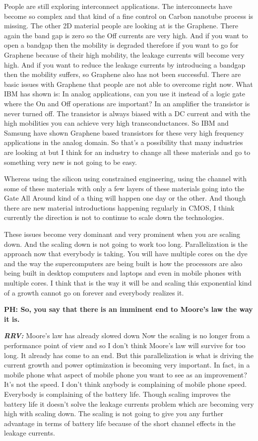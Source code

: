 \begin{multicols}{2}
People are still exploring interconnect applications. The interconnects have become so complex and that kind of a fine control on Carbon nanotube process is missing. The other 2D material people are looking at is the Graphene. There again the band gap is zero so the Off currents are very high. And if you want to open a bandgap then the mobility is degraded therefore if you want to go for Graphene because of their high mobility, the leakage currents will become very high. And if you want to reduce the leakage currents by introducing a bandgap then the mobility suffers, so Graphene also has not been successful. There are basic issues with Graphene that people are not able to overcome right now. What IBM has shown is: In analog applications, can you use it instead of a logic gate where the On and Off operations are important? In an amplifier the transistor is never turned off. The transistor is always biased with a DC current and with the high mobilities you can achieve very high transconductances. So IBM and Samsung have shown Graphene based transistors for these very high frequency applications in the analog domain. So that’s a possibility that many industries are looking at but I think for an industry to change all these materials and go to something very new is not going to be easy. 

Whereas using the silicon using constrained engineering, using the channel with some of these materials with only a few layers of these materials going into the Gate All Around kind of a thing will happen one day or the other. And though there are new material introductions happening regularly in CMOS, I think currently the direction is not to continue to scale down the technologies.

These issues become very dominant and very prominent when you are scaling down. And the scaling down is not going to work too long. Parallelization is the approach now that everybody is taking. You will have multiple cores on the dye and the way the supercomputers are being built is how the processors are also being built in desktop computers and laptops and even in mobile phones with multiple cores. I think that is the way it will be and scaling this exponential kind of a growth cannot go on forever and everybody realizes it.

\textbf{PH:  So, you say that there is an imminent end to Moore’s law the way it is.}

\textbf{\textit{RRV:}} Moore’s law has already slowed down Now the scaling is no longer from a performance point of view and so I don’t think Moore’s law will survive for too long. It already has come to an end. But this parallelization is what is driving the current growth and power optimization is becoming very important. In fact, in a mobile phone what aspect of mobile phone you want to see as an improvement? It’s not the speed. I don’t think anybody is complaining of mobile phone speed. Everybody is complaining of the battery life. Though scaling improves the battery life it doesn’t solve the leakage currents problem which are becoming very high with scaling down. The scaling is not going to give you any further advantage in terms of battery life because of the short channel effects in the leakage currents. 


\end{multicols}
